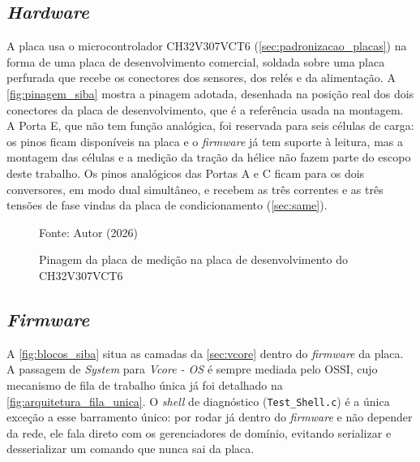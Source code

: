 \subsection{\textit{Hardware}}

A placa usa o microcontrolador CH32V307VCT6
(\autoref{sec:padronizacao_placas}) na forma de uma placa de desenvolvimento
comercial, soldada sobre uma placa perfurada que recebe os conectores dos
sensores, dos relés e da alimentação. A \autoref{fig:pinagem_siba} mostra a
pinagem adotada, desenhada na posição real dos dois conectores da placa de
desenvolvimento, que é a referência usada na montagem. A Porta E,
que não tem função analógica, foi reservada para seis células de carga: os
pinos ficam disponíveis na placa e o \textit{firmware} já tem suporte à
leitura, mas a montagem das células e a medição da tração da hélice não fazem
parte do escopo deste trabalho. Os
pinos analógicos das Portas A e C ficam para os dois conversores, em modo
dual simultâneo, e recebem as três correntes e as três tensões de fase vindas
da placa de condicionamento (\autoref{sec:same}).

\begin{figure}[H]
    \centering
    \caption{Pinagem da placa de medição na placa de desenvolvimento do CH32V307VCT6}
    \label{fig:pinagem_siba}
    \resizebox{\textwidth}{!}{}

    Fonte: Autor (2026)
\end{figure}

\subsection{\textit{Firmware}}

A \autoref{fig:blocos_siba} situa as camadas da \autoref{sec:vcore}
dentro do \textit{firmware} da placa. A passagem de \textit{System} para
\textit{Vcore - OS} é sempre mediada pelo OSSI, cujo mecanismo de fila de
trabalho única já foi detalhado na \autoref{fig:arquitetura_fila_unica}. O
\textit{shell} de diagnóstico (\texttt{Test\_Shell.c}) é a única exceção a
esse barramento único: por rodar já dentro do \textit{firmware} e não
depender da rede, ele fala direto com os gerenciadores de domínio, evitando
serializar e desserializar um comando que nunca sai da placa.

